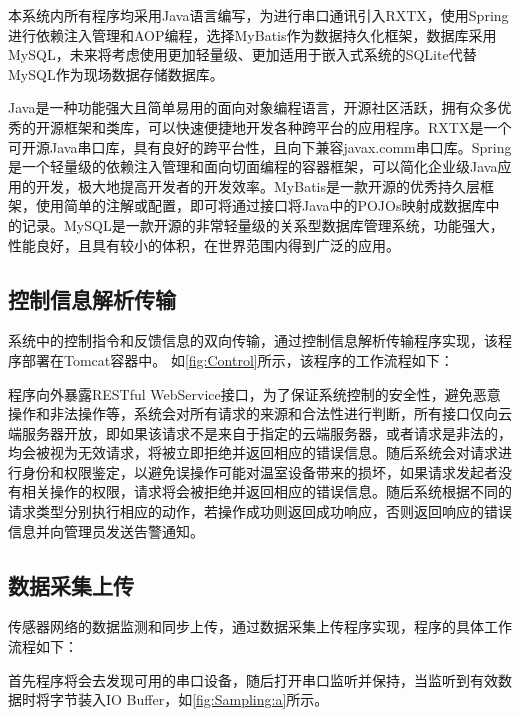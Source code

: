 本系统内所有程序均采用Java语言编写，为进行串口通讯引入RXTX，使用Spring进行依赖注入管理和AOP编程，选择MyBatis作为数据持久化框架，数据库采用MySQL，未来将考虑使用更加轻量级、更加适用于嵌入式系统的SQLite代替MySQL作为现场数据存储数据库。

Java是一种功能强大且简单易用的面向对象编程语言，开源社区活跃，拥有众多优秀的开源框架和类库，可以快速便捷地开发各种跨平台的应用程序。RXTX是一个可开源Java串口库，具有良好的跨平台性，且向下兼容javax.comm串口库。Spring是一个轻量级的依赖注入管理和面向切面编程的容器框架，可以简化企业级Java应用的开发，极大地提高开发者的开发效率。MyBatis是一款开源的优秀持久层框架，使用简单的注解或配置，即可将通过接口将Java中的POJOs映射成数据库中的记录。MySQL是一款开源的非常轻量级的关系型数据库管理系统，功能强大，性能良好，且具有较小的体积，在世界范围内得到广泛的应用。

	\subsection{控制信息解析传输}
	系统中的控制指令和反馈信息的双向传输，通过控制信息解析传输程序实现，该程序部署在Tomcat容器中。
如\ref{fig:Control}所示，该程序的工作流程如下：
\begin{figure}[!htp]
    \centering
    \resizebox{6cm}{!}{}
\end{figure}
程序向外暴露RESTful WebService接口，为了保证系统控制的安全性，避免恶意操作和非法操作等，系统会对所有请求的来源和合法性进行判断，所有接口仅向云端服务器开放，即如果该请求不是来自于指定的云端服务器，或者请求是非法的，均会被视为无效请求，将被立即拒绝并返回相应的错误信息。随后系统会对请求进行身份和权限鉴定，以避免误操作可能对温室设备带来的损坏，如果请求发起者没有相关操作的权限，请求将会被拒绝并返回相应的错误信息。随后系统根据不同的请求类型分别执行相应的动作，若操作成功则返回成功响应，否则返回响应的错误信息并向管理员发送告警通知。

	\subsection{数据采集上传}
	传感器网络的数据监测和同步上传，通过数据采集上传程序实现，程序的具体工作流程如下：
\begin{figure}[!htp]
    \subfigure[这是第一幅图]{
		\label{fig:Sampling:a} %
		\resizebox{6cm}{!}{}
	}
    \subfigure[这是第一幅图]{
		\label{fig:Sampling:b} %
		\resizebox{6cm}{!}{}
	}
\end{figure}
首先程序将会去发现可用的串口设备，随后打开串口监听并保持，当监听到有效数据时将字节装入IO Buffer，如\ref{fig:Sampling:a}所示。

